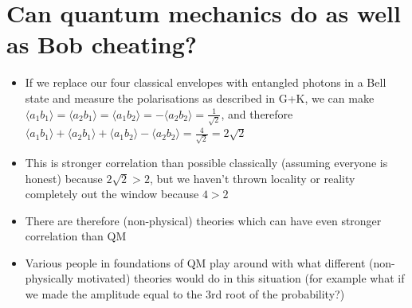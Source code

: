 \documentclass[english]{article}
\newcommand{\average}[1]{\langle #1 \rangle}
\begin{document}
\section{Can quantum mechanics do as well as Bob cheating?}

\begin{itemize}
\item If we replace our four classical envelopes with entangled photons in a Bell state and measure the polarisations as described in G+K, we can make $\average{a_1b_1}=\average{a_2b_1}=\average{a_1b_2}=-\average{a_2b_2}=\frac{1}{\sqrt{2}}$, and therefore $\average{a_1b_1}+\average{a_2b_1}+\average{a_1b_2}-\average{a_2b_2}=\frac{4}{\sqrt{2}}=2\sqrt{2}$
\item This is stronger correlation than possible classically (assuming everyone is honest) because $2\sqrt{2}>2$, but we haven't thrown locality or reality completely out the window because $4>2$
\item There are therefore (non-physical) theories which can have even stronger correlation than QM 
\item Various people in foundations of QM play around with what different (non-physically motivated) theories would do in this situation (for example what if we made the amplitude equal to the 3rd root of the probability?)
\end{itemize}
\end{document}

